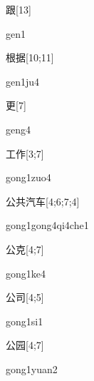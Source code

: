 \begin{verbete}[gen1]{跟}[13]
\begin{pronuncia}{gen1}
\end{pronuncia}
\end{verbete}

\begin{verbete}[gen1ju4]{根据}[10;11]
\begin{pronuncia}{gen1ju4}
\end{pronuncia}
\end{verbete}

\begin{verbete}[geng4]{更}[7]
\begin{pronuncia}{geng4}
\end{pronuncia}
\end{verbete}

\begin{verbete}{工作}[3;7]
\begin{pronuncia}{gong1zuo4}
\end{pronuncia}
\end{verbete}

\begin{verbete}{公共汽车}[4;6;7;4]
\begin{pronuncia}[\\]{gong1gong4qi4che1}
\end{pronuncia}
\end{verbete}

\begin{verbete}[gong1ke4]{公克}[4;7]
\begin{pronuncia}{gong1ke4}
\end{pronuncia}
\end{verbete}

\begin{verbete}[gong1si1]{公司}[4;5]
\begin{pronuncia}{gong1si1}
\end{pronuncia}
\end{verbete}

\begin{verbete}{公园}[4;7]
\begin{pronuncia}{gong1yuan2}
\end{pronuncia}
\end{verbete}

